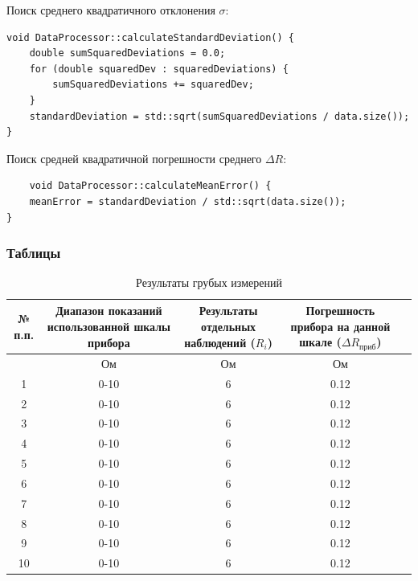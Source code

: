 Поиск среднего квадратичного отклонения $\sigma$:
\begin{verbatim}
void DataProcessor::calculateStandardDeviation() {
    double sumSquaredDeviations = 0.0;
    for (double squaredDev : squaredDeviations) {
        sumSquaredDeviations += squaredDev;
    }
    standardDeviation = std::sqrt(sumSquaredDeviations / data.size());
}
\end{verbatim}
Поиск средней квадратичной погрешности среднего $\Delta R$:
\begin{verbatim}
    void DataProcessor::calculateMeanError() {
    meanError = standardDeviation / std::sqrt(data.size());
}
\end{verbatim}
\newpage
\subsubsection{Таблицы}

\begin{center}
\begin{table}[h!]
\centering
\caption{Результаты грубых измерений}
\label{tabl:1}
\begin{tabular}{|c|c|c|c|c|}
\hline
\begin{minipage}{7mm}
    № п.п. 
\end{minipage}&
\begin{minipage}{5cm}
    Диапазон показаний использованной шкалы прибора
\end{minipage} &
\begin{minipage}{5cm}
    Результаты отдельных наблюдений ($R_i$)
\end{minipage} &
\begin{minipage}{5cm}
    Погрешность прибора на данной шкале ($\Delta R_{\text{приб}}$)
\end{minipage}\\
\hline
{}&Ом&Ом&Ом\\
\hline
1 &	0-10  &	6 & 0.12 \\
2 &	0-10  &	6	& 0.12 \\
3 &	0-10  &	6	& 0.12 \\
4 &	0-10  &	6 & 0.12 \\
5 & 0-10  &	6 & 0.12 \\
6 & 0-10  &	6 & 0.12 \\
7 & 0-10  &	6 & 0.12 \\
8 & 0-10  &	6 & 0.12 \\
9 & 0-10  &	6 & 0.12 \\
10& 0-10  &	6 & 0.12 \\
\hline
\end{tabular}
\end{table}
\end{center}

